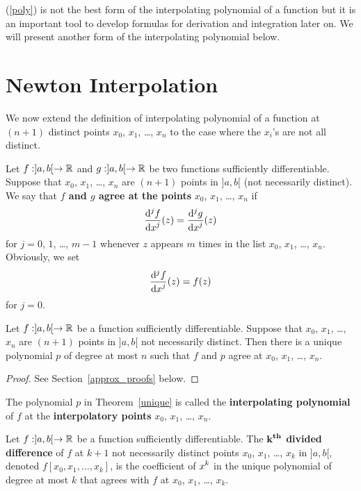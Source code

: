 (\ref{poly}) is not the best form of the interpolating polynomial of a
function but it is an important tool to develop formulas for
derivation and integration later on.  We will present another form of
the interpolating polynomial below.

\section{Newton Interpolation} \label{GenNewtonInter}

We now extend the definition of interpolating polynomial of a function
at $(n+1)$ distinct points $x_0$, $x_1$, \ldots, $x_n$ to the case
where the $x_i$'s are not all distinct.

\begin{defn}
Let $f: ]a,b[ \rightarrow \mathbb{R}$ and $g: ]a,b[ \rightarrow \mathbb{R}$ be two
functions sufficiently differentiable.  Suppose that $x_0$, $x_1$,
\ldots, $x_n$ are $(n+1)$ points in $]a,b[$ (not necessarily
distinct).  We say that
{\bfseries $f$ and $g$ agree at the points}
$x_0$, $x_1$, \ldots, $x_n$ if
\[
\displaystyle \frac{\mathrm{d}^{j}{f}} {\displaystyle \mathrm{d}{x}^{j}}(z) = \displaystyle \frac{\mathrm{d}^{j}{g}} {\displaystyle \mathrm{d}{x}^{j}}(z)
\]
for $j=0$, $1$, \ldots, $m-1$ whenever $z$ appears $m$ times in the list 
$x_0$, $x_1$, \ldots, $x_n$.  Obviously, we set
\[
\displaystyle \frac{\mathrm{d}^{j}{f}} {\displaystyle \mathrm{d}{x}^{j}}(z) = f(z)
\]
for $j=0$.
\end{defn}

\begin{theorem}
Let $f: ]a,b[ \rightarrow \mathbb{R}$ be a function sufficiently
differentiable.  Suppose that $x_0$, $x_1$, \ldots, $x_n$ are $(n+1)$
points in $]a,b[$ not necessarily distinct.
Then there is a unique polynomial $p$ of degree at most
$n$ such that $f$ and $p$ agree at $x_0$, $x_1$, \ldots, $x_n$.
\label{unique}
\end{theorem}

\begin{proof}
See Section~\ref{approx_proofs} below.
\end{proof}

\begin{defn}
The polynomial $p$ in Theorem~\ref{unique} is called the
{\bfseries interpolating polynomial}
of $f$ at the
{\bfseries interpolatory points}
$x_0$, $x_1$, \ldots , $x_n$.
\end{defn}

\begin{defn}
Let $f: ]a,b[ \rightarrow \mathbb{R}$ be a function sufficiently
differentiable.  The
{\bfseries $\displaystyle \mathbf{k^{th}}$ divided
difference}
of $f$ at $k+1$ not necessarily distinct points $x_0$, $x_1$, \ldots, $x_k$ in
$]a,b[$, denoted $f[x_0,x_1,\ldots,x_k]$, is the coefficient of
$\displaystyle x^k$
in the unique polynomial of degree at most $k$ that agrees with $f$ at
$x_0$, $x_1$, \ldots, $x_k$.
\end{defn}

